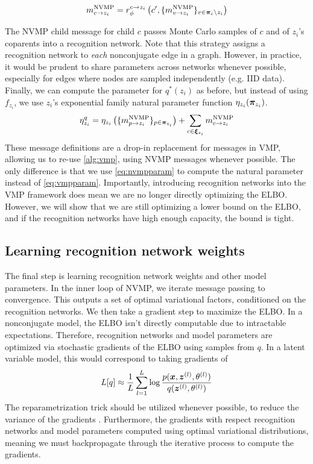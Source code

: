 \begin{equation}
    m^{\text{NVMP}}_{c \rightarrow z_i} = r^{c\rightarrow z_i}_{\phi}\left(
    c', \{m^{\text{NVMP}}_{v \rightarrow z_i}\}_{v \in \bm{\pi}_c \backslash z_i}\right)
\end{equation}

The NVMP child message for child $c$ passes Monte Carlo samples
of $c$ and of $z_i$'s coparents into a recognition network.
Note that this strategy assigns a recognition
network to \emph{each} nonconjugate edge
in a graph. However, in practice,
it would be prudent to share parameters
across networks
whenever possible,
especially for edges where nodes are sampled
independently (e.g. IID data).
Finally, we can compute the parameter for $q^*(z_i)$
as before, but instead of using $f_{z_i}$, we use $z_i$'s
exponential family natural parameter function $\eta_{z_i}(\bm{\pi}_{z_i})$.
\begin{equation}
    \label{eq:nvmpparam}
   \eta^q_{z_i} = \eta_{z_i}\left(\{m^{\text{NVMP}}_{p \rightarrow z_i}\}_{p \in \bm{\pi}_{z_i}}\right) + \sum_{c \in \bm{\xi}_{z_i}} m^{\text{NVMP}}_{c \rightarrow z_i}
\end{equation}
These message definitions are a drop-in replacement
for messages in VMP, allowing us to re-use \autoref{alg:vmp},
using NVMP messages whenever possible. The only
difference is that we use \autoref{eq:nvmpparam} to compute
the natural parameter instead of \autoref{eq:vmpparam}.
Importantly, introducing recognition networks
into the VMP framework does mean we are no longer
directly optimizing the ELBO. However, we will
show that we are still optimizing a lower
bound on the ELBO, and if the recognition networks
have high enough capacity, the bound is tight.

\subsection{Learning recognition network weights}
The final step is learning recognition network
weights and other model parameters.
In the inner loop of NVMP, we
iterate message passing to convergence.
This outputs a set of optimal variational
factors, conditioned on the recognition networks.
We then take a gradient step
to maximize the ELBO.
In a nonconjugate model, the ELBO isn't
directly computable due to intractable expectations.
Therefore, 
recognition networks and model parameters are optimized
via stochastic gradients of the ELBO using samples from $q$.
In a latent variable model, this would correspond to 
taking gradients of
\begin{equation}
    L[q] \approx \frac{1}{L}\sum_{l = 1}^L \log \frac{p(\bm{x}, \bm{z}^{(l)}, \theta^{(l)})}{q(\bm{z}^{(l)}, \theta^{(l)})}
\end{equation}
The reparametrization trick should be utilized whenever possible,
to reduce the variance of the gradients \cite{vae}.
Furthermore, the gradients with respect recognition networks
and model parameters computed using optimal variational
distributions, meaning we must backpropagate through
the iterative process to compute the gradients.

